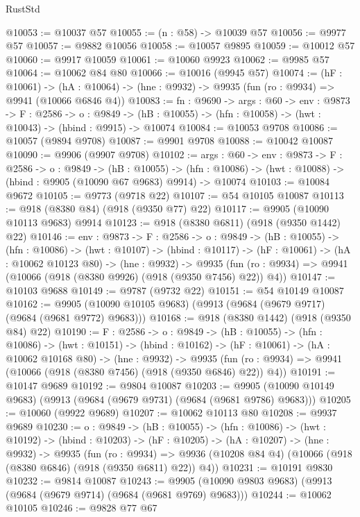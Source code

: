 \begin{lexlean}{RustStd}
\begin{coremodule}
@10053 := @10037 @57
@10055 := (n : @58) -> @10039 @57
@10056 := @9977 @57
@10057 := @9882 @10056
@10058 := @10057 @9895
@10059 := @10012 @57
@10060 := @9917 @10059
@10061 := @10060 @9923
@10062 := @9985 @57
@10064 := @10062 @84 @80
@10066 := @10016 (@9945 @57)
@10074 := (hF : @10061) ->
  (hA : @10064) -> (hne : @9932) -> @9935 (fun (ro : @9934) => @9941 (@10066 @6846 @4))
@10083 := {fn : @9690} ->
  {args : @60} ->
  {env : @9873} ->
  {F : @2586} ->
  {o : @9849} -> (hB : @10055) -> (hfn : @10058) -> (hwt : @10043) -> (hbind : @9915) -> @10074
@10084 := @10053 @9708
@10086 := @10057 (@9894 @9708)
@10087 := @9901 @9708
@10088 := @10042 @10087
@10090 := @9906 (@9907 @9708)
@10102 := {args : @60} ->
  {env : @9873} ->
  {F : @2586} ->
  {o : @9849} ->
  (hB : @10055) ->
  (hfn : @10086) -> (hwt : @10088) -> (hbind : @9905 (@10090 @67 @9683) @9914) -> @10074
@10103 := @10084 @9672
@10105 := @9773 (@9718 @22)
@10107 := @54 @10105 @10087
@10113 := @918 (@8380 @84) (@918 (@9350 @77) @22)
@10117 := @9905 (@10090 @10113 @9683) @9914
@10123 := @918 (@8380 @6811) (@918 (@9350 @1442) @22)
@10146 := {env : @9873} ->
  {F : @2586} ->
  {o : @9849} ->
  (hB : @10055) ->
  (hfn : @10086) ->
  (hwt : @10107) ->
  (hbind : @10117) ->
  (hF : @10061) ->
  (hA : @10062 @10123 @80) ->
  (hne : @9932) ->
  @9935 (fun (ro : @9934) => @9941 (@10066 (@918 (@8380 @9926) (@918 (@9350 @7456) @22)) @4))
@10147 := @10103 @9688
@10149 := @9787 (@9732 @22)
@10151 := @54 @10149 @10087
@10162 := @9905 (@10090 @10105 @9683) (@9913 (@9684 (@9679 @9717) (@9684 (@9681 @9772) @9683)))
@10168 := @918 (@8380 @1442) (@918 (@9350 @84) @22)
@10190 := {F : @2586} ->
  {o : @9849} ->
  (hB : @10055) ->
  (hfn : @10086) ->
  (hwt : @10151) ->
  (hbind : @10162) ->
  (hF : @10061) ->
  (hA : @10062 @10168 @80) ->
  (hne : @9932) ->
  @9935 (fun (ro : @9934) => @9941 (@10066 (@918 (@8380 @7456) (@918 (@9350 @6846) @22)) @4))
@10191 := @10147 @9689
@10192 := @9804 @10087
@10203 := @9905 (@10090 @10149 @9683) (@9913 (@9684 (@9679 @9731) (@9684 (@9681 @9786) @9683)))
@10205 := @10060 (@9922 @9689)
@10207 := @10062 @10113 @80
@10208 := @9937 @9689
@10230 := {o : @9849} ->
  (hB : @10055) ->
  (hfn : @10086) ->
  (hwt : @10192) ->
  (hbind : @10203) ->
  (hF : @10205) ->
  (hA : @10207) ->
  (hne : @9932) ->
  @9935
    (fun (ro : @9934) =>
    @9936 (@10208 @84 @4) (@10066 (@918 (@8380 @6846) (@918 (@9350 @6811) @22)) @4))
@10231 := @10191 @9830
@10232 := @9814 @10087
@10243 := @9905 (@10090 @9803 @9683) (@9913 (@9684 (@9679 @9714) (@9684 (@9681 @9769) @9683)))
@10244 := @10062 @10105
@10246 := @9828 @77 @67

\end{coremodule}
\end{lexlean}
